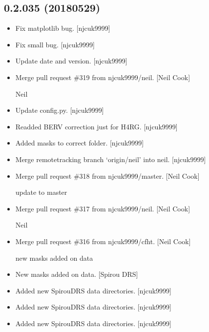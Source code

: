 \documentclass[a4paper,10pt,english]{report}
\begin{document}
\subsection{0.2.035 (2018\sphinxhyphen{}05\sphinxhyphen{}29)}
\label{\detokenize{misc/changelog:id446}}\begin{itemize}
\item {} 
Fix matplotlib bug. {[}njcuk9999{]}

\item {} 
Fix small bug. {[}njcuk9999{]}

\item {} 
Update date and version. {[}njcuk9999{]}

\item {} 
Merge pull request \#319 from njcuk9999/neil. {[}Neil Cook{]}

Neil

\item {} 
Update config.py. {[}njcuk9999{]}

\item {} 
Re\sphinxhyphen{}added BERV correction just for H4RG. {[}njcuk9999{]}

\item {} 
Added masks to correct folder. {[}njcuk9999{]}

\item {} 
Merge remote\sphinxhyphen{}tracking branch ‘origin/neil’ into neil. {[}njcuk9999{]}

\item {} 
Merge pull request \#318 from njcuk9999/master. {[}Neil Cook{]}

update to master

\item {} 
Merge pull request \#317 from njcuk9999/neil. {[}Neil Cook{]}

Neil

\item {} 
Merge pull request \#316 from njcuk9999/cfht. {[}Neil Cook{]}

new masks added on data

\item {} 
New masks added on data. {[}Spirou DRS{]}

\item {} 
Added new SpirouDRS data directories. {[}njcuk9999{]}

\item {} 
Added new SpirouDRS data directories. {[}njcuk9999{]}

\item {} 
Added new SpirouDRS data directories. {[}njcuk9999{]}


\end{itemize}
\end{document}
